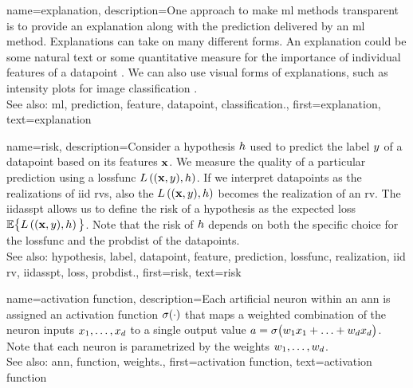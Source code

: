 {name={explanation},
	description={One approach to make \gls{ml} methods transparent is to provide an 
		explanation along with the \gls{prediction} delivered by an 
		\gls{ml} method. Explanations can take on many different forms. An explanation 
		could be some natural text or some quantitative measure for the importance 
		of individual \glspl{feature} of a \gls{datapoint} \cite{Molnar2019}. We can also 
		use visual forms of explanations, such as intensity plots for image \gls{classification} \cite{GradCamPaper}.
					\\ 
		See also: \gls{ml}, \gls{prediction}, \gls{feature}, \gls{datapoint}, \gls{classification}.},
	first={explanation},
	text={explanation} 
}

{name={risk},
	description={Consider a \gls{hypothesis} $h$ used to predict the \gls{label} 
		$y$ of a \gls{datapoint} based on its \glspl{feature} ${\bf x}$. We measure 
		the quality of a particular \gls{prediction} using a \gls{lossfunc} $L\left(({\bf x},y),h \right)$. 
		If we interpret \glspl{datapoint} as the \glspl{realization} of \gls{iid} \glspl{rv}, 
		also the $L\left(({\bf x},y),h \right)$ becomes the \gls{realization} 
		of an \gls{rv}. The \gls{iidasspt} allows us to define the risk of a \gls{hypothesis} 
		as the expected \gls{loss} $\mathbb{E} \big\{L\left(({\bf x},y),h \right) \big\}$. 
		Note that the risk of $h$ depends on both the specific choice for the \gls{lossfunc} and the 
		\gls{probdist} of the \glspl{datapoint}.
					\\ 
		See also: \gls{hypothesis}, \gls{label}, \gls{datapoint}, \gls{feature}, \gls{prediction}, \gls{lossfunc}, \gls{realization}, \gls{iid} \gls{rv}, \gls{iidasspt}, \gls{loss}, \gls{probdist}.},
	first={risk},
	text={risk} 
}

{name={activation function},
	description={Each artificial neuron within an \gls{ann} is 
		assigned an activation \gls{function} $\sigma(\cdot)$ that maps a weighted combination of 
		the neuron inputs $x_{1}, \ldots, x_{d}$ to a single output 
		value $a = \sigma\big(w_{1} x_{1}+\ldots+w_{d} x_{d} \big)$. 
		Note that each neuron is parametrized by the \gls{weights} $w_{1}, \ldots, w_{d}$.
					\\ 
		See also: \gls{ann}, \gls{function}, \gls{weights}.},
	first={activation function},
	text={activation function} 
}

